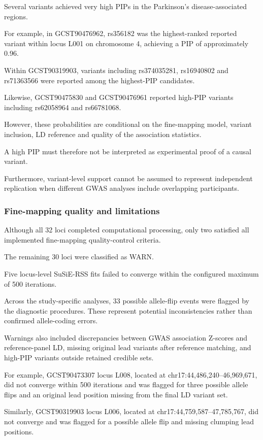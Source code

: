 \documentclass[11pt,a4paper]{article}
\begin{document}
Several variants achieved very high PIPs in the
Parkinson's disease-associated regions.

For example, in GCST90476962, rs356182 was the
highest-ranked reported variant within locus L001
on chromosome 4, achieving a PIP of approximately 0.96.

Within GCST90319903, variants including rs374035281,
rs16940802 and rs71363566 were reported among
the highest-PIP candidates.

Likewise, GCST90475830 and GCST90476961
reported high-PIP variants including rs62058964
and rs66781068.

However, these probabilities are conditional on the
fine-mapping model, variant inclusion, LD reference
and quality of the association statistics.

A high PIP must therefore not be interpreted as
experimental proof of a causal variant.

Furthermore, variant-level support cannot be assumed
to represent independent replication when different
GWAS analyses include overlapping participants.


\subsubsection{Fine-mapping quality and limitations}

Although all 32 loci completed computational processing,
only two satisfied all implemented fine-mapping
quality-control criteria.

The remaining 30 loci were classified as WARN.

Five locus-level SuSiE-RSS fits failed to converge
within the configured maximum of 500 iterations.

Across the study-specific analyses, 33 possible
allele-flip events were flagged by the diagnostic
procedures. These represent potential inconsistencies
rather than confirmed allele-coding errors.

Warnings also included discrepancies between GWAS
association Z-scores and reference-panel LD,
missing original lead variants after reference matching,
and high-PIP variants outside retained credible sets.

For example, GCST90473307 locus L008,
located at chr17:44,486,240--46,969,671,
did not converge within 500 iterations and was
flagged for three possible allele flips and an
original lead position missing from the final
LD variant set.

Similarly, GCST90319903 locus L006,
located at chr17:44,759,587--47,785,767,
did not converge and was flagged for a possible
allele flip and missing clumping lead positions.
\end{document}
